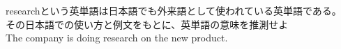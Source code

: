 \documentclass{jarticle}
\begin{document}
\vspace*{\fill}
\begin{center}
researchという英単語は日本語でも外来語として使われている英単語である。\\
その日本語での使い方と例文をもとに、英単語の意味を推測せよ\\
The company is doing research on the new product.
\end{center}
\vspace*{\fill}
\end{document}
